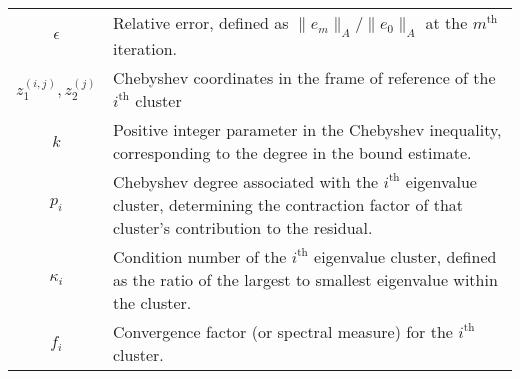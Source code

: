 \begin{longtable}{c p{10cm}}
    $\epsilon$               & Relative error, defined as $\|e_m\|_A/\|e_0\|_A$ at the $m^{\text{th}}$ iteration.                                                                                 \\
    $z^{(i,j)}_1, z^{(j)}_2$ & Chebyshev coordinates in the frame of reference of the $i^{\text{th}}$ cluster                                                                                     \\
    $k$                      & Positive integer parameter in the Chebyshev inequality, corresponding to the degree in the bound estimate.                                                         \\
    $p_i$                    & Chebyshev degree associated with the $i^\text{th}$ eigenvalue cluster, determining the contraction factor of that cluster's contribution to the residual.          \\
    $\kappa_i$               & Condition number of the $i^\text{th}$ eigenvalue cluster, defined as the ratio of the largest to smallest eigenvalue within the cluster.                           \\
    $f_i$                    & Convergence factor (or spectral measure) for the $i^\text{th}$ cluster.                                                                                            \\
\end{longtable}

